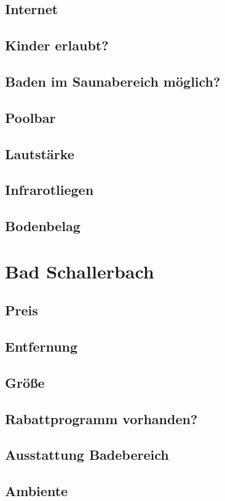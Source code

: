 \documentclass{article}
\begin{document}
\subsection*{Internet}
\subsection*{Kinder erlaubt?}
\subsection*{Baden im Saunabereich möglich?}
\subsection*{Poolbar}
\subsection*{Lautstärke}
\subsection*{Infrarotliegen}
\subsection*{Bodenbelag}
\pagebreak

\section*{Bad Schallerbach}
\subsection*{Preis}
\subsection*{Entfernung}
\subsection*{Größe}
\subsection*{Rabattprogramm vorhanden?}
\subsection*{Ausstattung Badebereich}
\subsection*{Ambiente}
\end{document}
